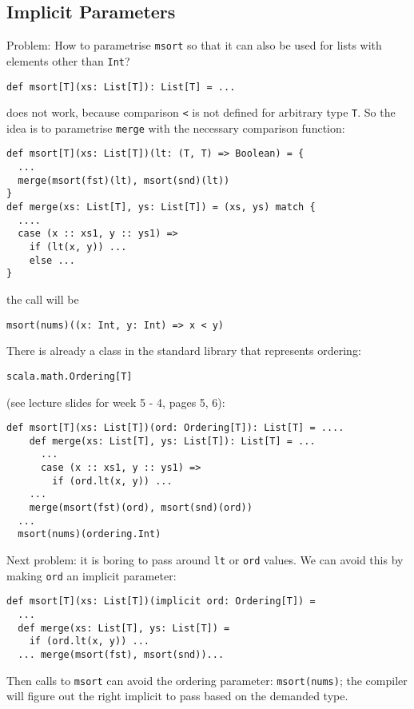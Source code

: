 \documentclass{scrartcl}
\begin{document}
\subsection{Implicit Parameters}
\label{sec:ImplicitParameters}

Problem: How to parametrise \lstinline|msort| so that it can also be used for
lists with elements other than \lstinline|Int|?
\begin{lstlisting}
def msort[T](xs: List[T]): List[T] = ...
\end{lstlisting}
does not work, because comparison \lstinline|<| is not defined for arbitrary
type \lstinline|T|. So the idea is to parametrise \lstinline|merge| with the
necessary comparison function:
\begin{lstlisting}
def msort[T](xs: List[T])(lt: (T, T) => Boolean) = {
  ...
  merge(msort(fst)(lt), msort(snd)(lt))
}
def merge(xs: List[T], ys: List[T]) = (xs, ys) match {
  ....
  case (x :: xs1, y :: ys1) =>
    if (lt(x, y)) ...
    else ...
}
\end{lstlisting}
the call will be
\begin{lstlisting}
msort(nums)((x: Int, y: Int) => x < y)
\end{lstlisting}

There is already a class in the standard library that represents ordering:
\begin{lstlisting}
scala.math.Ordering[T]
\end{lstlisting}
(see lecture slides for week 5 - 4, pages 5, 6):
\begin{lstlisting}
def msort[T](xs: List[T])(ord: Ordering[T]): List[T] = ....
    def merge(xs: List[T], ys: List[T]): List[T] = ...
      ...
      case (x :: xs1, y :: ys1) =>
        if (ord.lt(x, y)) ...
    ...
    merge(msort(fst)(ord), msort(snd)(ord))
  ...
  msort(nums)(ordering.Int)
\end{lstlisting}
Next problem: it is boring to pass around \lstinline|lt| or \lstinline|ord|
values. We can avoid this by making \lstinline|ord| an implicit parameter:
\begin{lstlisting}
def msort[T](xs: List[T])(implicit ord: Ordering[T]) =
  ...
  def merge(xs: List[T], ys: List[T]) =
    if (ord.lt(x, y)) ...
  ... merge(msort(fst), msort(snd))...
\end{lstlisting}

Then calls to \lstinline|msort| can avoid the ordering parameter:
\lstinline|msort(nums)|; the compiler will figure out the right implicit to pass
based on the demanded type.
\end{document}
